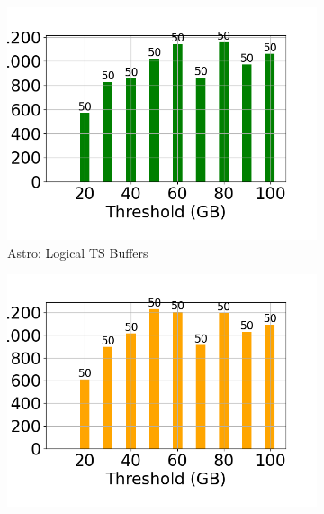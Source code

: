 \begin{figure}
	\centering
	\begin{subfigure}[c]{0.48\textwidth}
		\includegraphics[width=1\textwidth]   {figures/Experiments/Dynamic/ASTRO/Batch_processing/70/average_query_time_per_batch_version_999777015_10485760_10_delay[70].png}
		\caption{Astro: Logical TS Buffers}
		\label{fig:logical-ts-70-astro}
	\end{subfigure}
	\begin{subfigure}[c]{0.48\textwidth}
		\includegraphics[width=1\textwidth]	 {figures/Experiments/Dynamic/ASTRO/Batch_processing/70/average_query_time_per_batch_version_999777018_10485760_10_delay[70].png}

\end{subfigure}
\end{figure}
